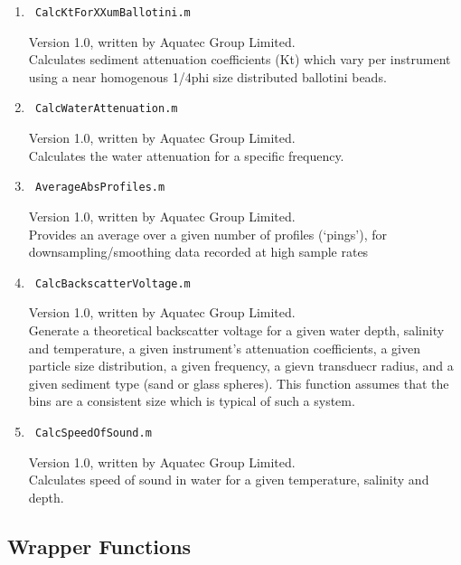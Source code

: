 \documentclass[a4paper,10pt]{report}
\begin{document}
\begin{enumerate}
 \item
\begin{verbatim} CalcKtForXXumBallotini.m \end{verbatim}
Version 1.0, written by Aquatec Group Limited.\\
Calculates sediment attenuation coefficients (Kt) \textemdash which vary per instrument \textemdash using a near homogenous 1/4phi size distributed ballotini beads.

 \item
\begin{verbatim} CalcWaterAttenuation.m \end{verbatim}
Version 1.0, written by Aquatec Group Limited.\\
Calculates the water attenuation for a specific frequency.

 \item
\begin{verbatim} AverageAbsProfiles.m \end{verbatim}
Version 1.0, written by Aquatec Group Limited.\\
Provides an average over a given number of profiles (`pings'), for downsampling/smoothing data recorded at high sample rates

 \item
\begin{verbatim} CalcBackscatterVoltage.m \end{verbatim}
Version 1.0, written by Aquatec Group Limited.\\
Generate a theoretical backscatter voltage for a given water depth, salinity and temperature, a given instrument's attenuation coefficients, a given particle size distribution, a given frequency, a gievn transduecr radius, and a given sediment type (sand or glass spheres). This function assumes that the bins are a consistent size which is typical of such a system.

 \item
\begin{verbatim} CalcSpeedOfSound.m \end{verbatim}
Version 1.0, written by Aquatec Group Limited.\\
Calculates speed of sound in water for a given temperature, salinity and depth.

\end{enumerate}

\subsection{Wrapper Functions}
\end{document}
